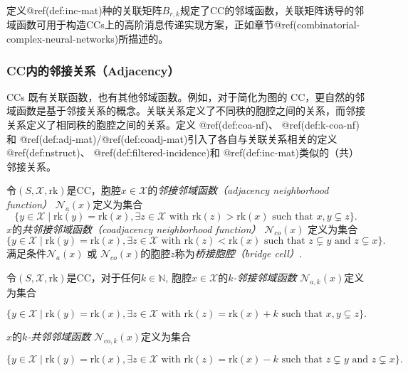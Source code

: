 \documentclass[
  12pt,
]{krantz}
\begin{document}
定义@ref(def:inc-mat)种的关联矩阵\(B_{r,k}\)规定了CC的邻域函数，关联矩阵诱导的邻域函数可用于构造CCs上的高阶消息传递实现方案，正如章节@ref(combinatorial-complex-neural-networks)所描述的。

\subsubsection{CC内的邻接关系（Adjacency）}\label{ccux5185ux7684ux90bbux63a5ux5173ux7cfbadjacency}

CCs 既有关联函数，也有其他邻域函数。例如，对于简化为图的
CC，更自然的邻域函数是基于邻接关系的概念。关联关系定义了不同秩的胞腔之间的关系，而邻接关系定义了相同秩的胞腔之间的关系。定义
@ref(def:coa-nf)、 @ref(def:k-coa-nf)和
@ref(def:adj-mat)/@ref(def:coadj-mat)引入了各自与关联关系相关的定义
@ref(def:nstruct)、 @ref(def:filtered-incidence)和
@ref(def:inc-mat)类似的（共）邻接关系。

\label{coa-nf}
令\((S,\mathcal{X}, \mbox{rk})\)是CC，胞腔\(x\in \mathcal{X}\)的\emph{邻接邻域函数（adjacency
neighborhood function）} \(\mathcal{N}_{a}(x)\)定义为集合
\begin{equation*}
\{  y \in \mathcal{X} \mid \mbox{rk}(y)=\mbox{rk}(x), \exists z \in \mathcal{X} \text{ with } \mbox{rk}(z)>\mbox{rk}(x) \text{ such that } x,y\subsetneq z\}.
\end{equation*} \(x\)的\emph{共邻接邻域函数（coadjacency neighborhood
function）} \(\mathcal{N}_{co}(x)\) 定义为集合 \begin{equation*}
\{ y \in \mathcal{X} \mid \mbox{rk}(y)=\mbox{rk}(x), \exists z \in \mathcal{X}
\text{ with } \mbox{rk}(z)<\mbox{rk}(x) \text{ such that } z\subsetneq y\text{ and }z\subsetneq x \}.
\end{equation*} 满足条件\(\mathcal{N}_{a}(x)\) 或
\(\mathcal{N}_{co}(x)\)的胞腔\(z\)称为\emph{桥接胞腔（bridge cell）}.

\label{k-coa-nf}
令\((S, \mathcal{X}, \mbox{rk})\)是CC，对于任何\(k\in\mathbb{N}\),
胞腔\(x \in \mathcal{X}\)的\emph{\(k\)-邻接邻域函数}
\(\mathcal{N}_{a,k}(x)\)定义为集合

\begin{equation*}
\{ y \in \mathcal{X} \mid \mbox{rk}(y)=\mbox{rk}(x),
\exists z \in \mathcal{X}
\text{ with } \mbox{rk}(z)=\mbox{rk}(x)+k \text{ such that } x,y\subsetneq z \}.
\end{equation*}

\(x\)的\emph{\(k\)-共邻邻域函数} \(\mathcal{N}_{co,k}(x)\)定义为集合

\begin{equation*}
\{ y \in \mathcal{X} \mid \mbox{rk}(y)=\mbox{rk}(x),
\exists z \in \mathcal{X}
\text{ with } \mbox{rk}(z)=\mbox{rk}(x)-k
\text{ such that } z\subsetneq y\text{ and }z\subsetneq x \}.
\end{equation*}
\end{document}
